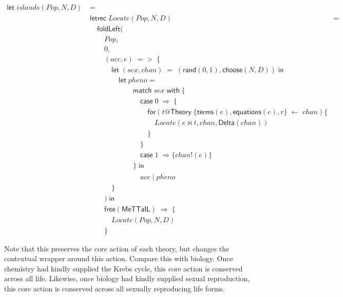 \documentclass{article}
\begin{document}
\begin{align*}
  \mathsf{let}\; islands( Pop, N, D )\; &= \\
  & \mathsf{letrec}\; Locate( Pop, N, D ) &= \\
    &\quad \mathsf{foldLeft}( \\
      &\quad\quad Pop, \\
      &\quad\quad 0, \\
      &\quad\quad ( acc, e ) \;\mathsf{=>}\; \{ \\
      &\quad\quad\quad \mathsf{let}\; ( sex, chan )\; \mathsf{=}\; ( \mathsf{rand}( 0, 1 ), \mathsf{choose}( N, D ) ) \;\mathsf{in}\; \\
        &\quad\quad\quad\quad \mathsf{let}\; pheno = \\
          &\quad\quad\quad\quad\quad\quad \mathsf{match}\; sex\; \mathsf{with}\; \{ \\
            &\quad\quad\quad\quad\quad\quad\quad \mathsf{case}\; 0\; \Rightarrow\; \{ \\
              &\quad\quad\quad\quad\quad\quad\quad\quad \mathsf{for}( t\mathsf{@}\mathsf{Theory}\;\{ \mathsf{terms}( e ), \mathsf{equations}( e ), r \} \;\leftarrow\; chan )\{ \\
                &\quad\quad\quad\quad\quad\quad\quad\quad\quad Locate( e \Join t, { chan }, \mathsf{Delta}( chan ) ) \\
              &\quad\quad\quad\quad\quad\quad\quad\quad \} \\
            &\quad\quad\quad\quad\quad\quad\quad \} \\
            &\quad\quad\quad\quad\quad\quad\quad \mathsf{case}\; 1\; \Rightarrow \{ chan\mathsf{!}( e ) \} \\
         &\quad\quad\quad\quad\quad\quad \} \;\mathsf{in}\; \\
          &\quad\quad\quad\quad\quad\quad\quad acc \; \mathsf{|}\; pheno \\
      &\quad\quad\quad \} \\
    &\quad\quad ) \; \mathsf{in}\; \\
   &\quad\quad \mathsf{free}( \mathsf{MeTTaIL} ) \; \Rightarrow \; \{ \\
      &\quad\quad\quad Locate( Pop, N, D ) \\
   &\quad\quad\} 
\end{align*}

Note that this preserves the core action of each theory, but changes the
contextual wrapper around this action. Compare this with biology. Once
chemistry had kindly supplied the Krebs cycle, this core action is conserved
across all life. Likewise, once biology had kindly supplied sexual
reproduction, this core action is conserved across all sexually reproducing
life forms.
\end{document}
